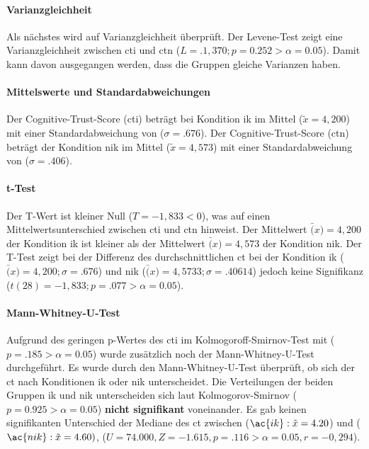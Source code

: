 \documentclass[a4paper,11pt]{article}%
\renewcommand{\\}{\vspace*{0.5\baselineskip} \newline}
\begin{document}
\paragraph{Varianzgleichheit}
Als nächstes wird auf Varianzgleichheit überprüft. Der Levene-Test zeigt eine Varianzgleichheit zwischen \ac{cti} und \ac{ctn} ($L = .1,370; p=0.252 > \alpha = 0.05$). Damit kann davon ausgegangen werden, dass die Gruppen gleiche Varianzen haben. 
\paragraph{Mittelswerte und Standardabweichungen}
Der Cognitive-Trust-Score (\ac{cti}) beträgt bei Kondition \ac{ik} im Mittel ($\tilde x = 4,200$) mit einer Standardabweichung von ($\sigma = .676$).\newline 
Der Cognitive-Trust-Score (\ac{ctn}) beträgt der Kondition \ac{nik} im Mittel ($\tilde x = 4,573$) mit einer Standardabweichung von ($\sigma = .406$).

\paragraph{t-Test}
Der T-Wert ist kleiner Null ($T = -1,833 < 0$), was auf einen Mittelwertsunterschied zwischen \ac{cti} und \ac{ctn} hinweist. Der Mittelwert $\bar(x) = 4,200$ der Kondition \ac{ik} ist kleiner als der Mittelwert $\bar(x) = 4,573$ der Kondition \ac{nik}.
Der T-Test zeigt bei der Differenz des durchschnittlichen \ac{ct} bei der Kondition \ac{ik} ($\bar(x) = 4,200; \sigma = .676$) und \ac{nik} ($\bar(x) = 4,5733; \sigma =.40614$) jedoch keine Signifikanz ($t(28) = -1,833; p = .077 > \alpha = 0.05$).

\paragraph{Mann-Whitney-U-Test}
Aufgrund des geringen p-Wertes des \ac{cti} im Kolmogoroff-Smirnov-Test mit ($p = .185 > \alpha = 0.05$) wurde zusätzlich noch der Mann-Whitney-U-Test durchgeführt.
Es wurde durch den Mann-Whitney-U-Test überprüft, ob sich der \ac{ct} nach Konditionen \ac{ik} oder \ac{nik} unterscheidet. Die Verteilungen der beiden Gruppen \ac{ik} und \ac{nik} unterscheiden sich laut Kolmogorov-Smirnov ($p = 0.925 > \alpha = 0.05$) \textbf{nicht signifikant} voneinander. Es gab keinen signifikanten Unterschied der Mediane des \ac{ct} zwischen ($\ac{ik} : \tilde x = 4.20$) und ($\ac{nik} : \tilde x = 4.60)$, ($U = 74.000, Z = -1.615, p = .116 > \alpha = 0.05, r =-0,294$).
\end{document}
